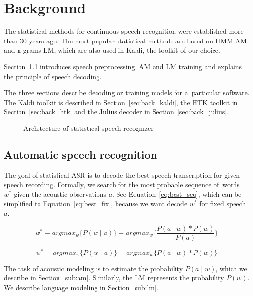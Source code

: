 \chapter{Background}
\label{cha:background}

The statistical methods for continuous speech recognition were established more than 30 years ago. 
The most popular statistical methods are based on \ac{HMM} \acl{AM} and n-grams \ac{LM},
which are also used in Kaldi, the toolkit of our choice.

Section~\ref{sec:back_asr} introduces speech preprocessing, \ac{AM} and \ac{LM} training
and explains the principle of speech decoding.

The~three sections describe decoding or training models for a~particular software.
The Kaldi toolkit is described in Section~\ref{sec:back_kaldi}, 
the \ac{HTK} toolkit in Section~\ref{sec:back_htk} and 
the Julius decoder in Section~\ref{sec:back_julius}.

\begin{figure}[!htp]
    \begin{center}
    
    \caption{Architecture of statistical speech recognizer\cite{ney1990acoustic}}
    \label{fig:components} 
    \end{center}
\end{figure}

\section{Automatic speech recognition}
\label{sec:back_asr}

The goal of statistical \ac{ASR} is to decode 
the best speech transcription for given speech recording.
Formally, we search for the most probable sequence of~words $w^*$ given the acoustic observations $a$.
See Equation~\ref{eq:best_seq}, which can be simplified to Equation~\ref{eq:best_fix},
because we want decode $w^*$ for fixed speech $a$.

\begin{equation}\label{eq:best_seq}
    w^* = argmax_{w}\{P(w \mid a)\} = argmax_{w}\{\frac{P(a \mid w) * P(w)}{P(a)}\}
\end{equation}

\begin{equation}\label{eq:best_fix}
    w^* = argmax_{w}\{P(w \mid a)\} = argmax_{w}\{P(a \mid w) * P(w)\}
\end{equation}

The task of acoustic modeling is to estimate the probability $P(a \mid w)$,
which we describe in Section~\ref{sub:am}. 
Similarly, the \ac{LM} represents the probability $P(w)$.
We describe language modeling in Section~\ref{sub:lm}.

